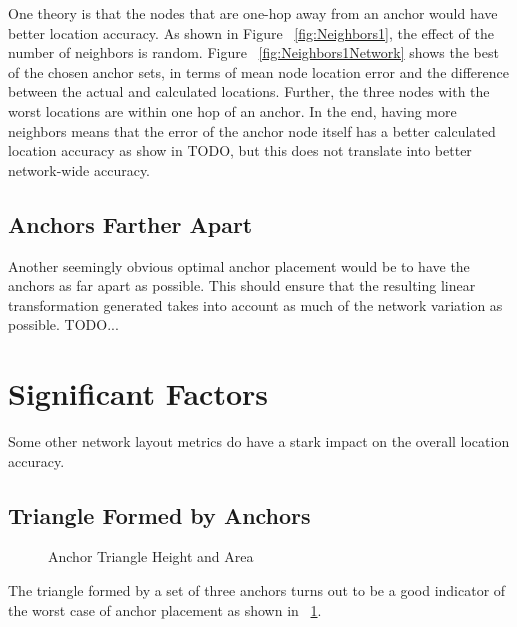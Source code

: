 One theory is that the nodes that are one-hop away from an anchor would have better location accuracy.  As shown in Figure ~\ref{fig:Neighbors1}, the effect of the number of neighbors is random.  Figure ~\ref{fig:Neighbors1Network} shows the best of the chosen anchor sets, in terms of mean node location error and the difference between the actual and calculated locations.  Further, the three nodes with the worst locations are within one hop of an anchor.  In the end, having more neighbors means that the error of the anchor node itself has a better calculated location accuracy as show in TODO, but this does not translate into better network-wide accuracy.


\subsection{Anchors Farther Apart}

Another seemingly obvious optimal anchor placement would be to have the anchors as far apart as possible.  This should ensure that the resulting linear transformation generated takes into account as much of the network variation as possible.   TODO...

\section{Significant Factors}

Some other network layout metrics do have a stark impact on the overall location accuracy.

\subsection{Triangle Formed by Anchors}

\begin{figure}
  \centering
    \caption{Anchor Triangle Height and Area}
    \label{fig:TriangleAreaHeight1}
\end{figure}

The triangle formed by a set of three anchors turns out to be a good indicator of the worst case of anchor placement as shown in ~\ref{fig:TriangleAreaHeight1}.
